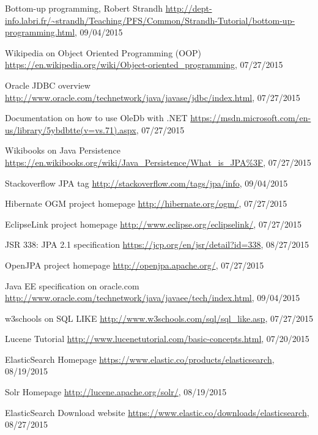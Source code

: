 \begin{thebibliography}{100}
	 Bottom-up programming, Robert Strandh
	\url{http://dept-info.labri.fr/~strandh/Teaching/PFS/Common/Strandh-Tutorial/bottom-up-programming.html},
	09/04/2015
	
	 Wikipedia on Object Oriented Programming (OOP)
	\url{https://en.wikipedia.org/wiki/Object-oriented_programming}, 07/27/2015
	
	 Oracle JDBC overview
	\url{http://www.oracle.com/technetwork/java/javase/jdbc/index.html}, 07/27/2015
	
	 Documentation on how to use OleDb with .NET
	\url{https://msdn.microsoft.com/en-us/library/5ybdbtte(v=vs.71).aspx}, 07/27/2015
	
	 Wikibooks on Java Persistence
	\url{https://en.wikibooks.org/wiki/Java_Persistence/What_is_JPA\%3F}, 07/27/2015
	
	 Stackoverflow JPA tag
	\url{http://stackoverflow.com/tags/jpa/info}, 09/04/2015
	
	 Hibernate OGM project homepage
	\url{http://hibernate.org/ogm/}, 07/27/2015
	
	 EclipseLink project homepage
	\url{http://www.eclipse.org/eclipselink/}, 07/27/2015
	
	 JSR 338: JPA 2.1 specification
	\url{https://jcp.org/en/jsr/detail?id=338}, 08/27/2015
	
	 OpenJPA project homepage
	\url{http://openjpa.apache.org/}, 07/27/2015
	
	 Java EE specification on oracle.com
	\url{http://www.oracle.com/technetwork/java/javaee/tech/index.html}, 09/04/2015
	
	 w3schools on SQL LIKE
	\url{http://www.w3schools.com/sql/sql_like.asp}, 07/27/2015
	
	 Lucene Tutorial
	\url{http://www.lucenetutorial.com/basic-concepts.html}, 07/20/2015
	
	 ElasticSearch Homepage
	\url{https://www.elastic.co/products/elasticsearch}, 08/19/2015
	
	 Solr Homepage
	\url{http://lucene.apache.org/solr/}, 08/19/2015
	
	 ElasticSearch Download website
	\url{https://www.elastic.co/downloads/elasticsearch}, 08/27/2015
	

\end{thebibliography}
